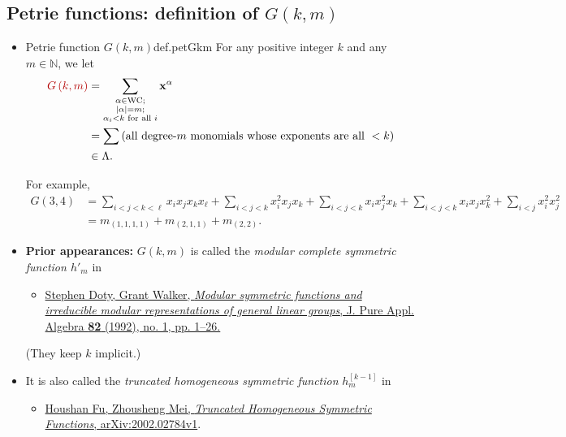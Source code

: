 \documentclass[numbers=enddot,12pt,final,onecolumn,notitlepage]{scrartcl}%
\newcommand{\red}{\color{red}}
\newcommand{\defnm}[1]{{\color{darkred} #1}}
\newcommand{\0}{\phantom{c}}
\let\sumnonlimits\sum
\renewcommand{\sum}{\sumnonlimits\limits}
\newcommand{\nowbox}{\hphantom{x} \vspace{-1.5pc}}
\begin{document}
\subsection{Petrie functions: definition of $G(k,m)$}

\begin{itemize}
\item \nowbox
\begin{definition}{Petrie function $G(k,m)$}{def.petGkm}
For any positive integer $k$ and any $m\in\mathbb{N}$, we let%
\begin{align*}
\defnm{G\left( k,m\right)}  &  =\sum_{\substack{\alpha\in\operatorname*{WC}%
;\\\left\vert \alpha\right\vert =m;\\\alpha_{i}<k\text{ for all }i}%
}\mathbf{x}^{\alpha}\\
&  =\sum\left(  \text{all degree-}m\text{ monomials whose exponents are all
}<k\right) \\
&  \in\Lambda.
\end{align*}
\end{definition}

For example,%
\begin{align*}
G\left(  3,4\right)   &  =\sum_{i<j<k<\ell}x_{i}x_{j}x_{k}x_{\ell}%
+\sum_{i<j<k}x_{i}^{2}x_{j}x_{k}+\sum_{i<j<k}x_{i}x_{j}^{2}x_{k}+\sum
_{i<j<k}x_{i}x_{j}x_{k}^{2}+\sum_{i<j}x_{i}^{2}x_{j}^{2}\\
&  =m_{\left(  1,1,1,1\right)  }+m_{\left(  2,1,1\right)  }+m_{\left(
2,2\right)  }.
\end{align*}

\item \textbf{Prior appearances:} $G\left(k, m\right)$ is called the
\emph{modular complete symmetric function $h'_m$} in
\begin{itemize}
\item {\red \href{https://doi.org/10.1016/0022-4049(92)90007-3}{Stephen Doty, Grant
Walker, \textit{Modular symmetric functions and irreducible modular
representations of general linear groups}, J. Pure Appl. Algebra \textbf{82}
(1992), no. 1, pp. 1--26.}}
\end{itemize}
(They keep $k$ implicit.)

\item It is also called the
\emph{truncated homogeneous symmetric function}
$h_{m}^{\left[  k-1\right]  }$
in
\begin{itemize}
\item {\red \href{https://arxiv.org/abs/2002.02784v1}{Houshan
Fu, Zhousheng Mei, \textit{Truncated Homogeneous Symmetric Functions},
arXiv:2002.02784v1}. }
\end{itemize}


\end{itemize}
\end{document}
